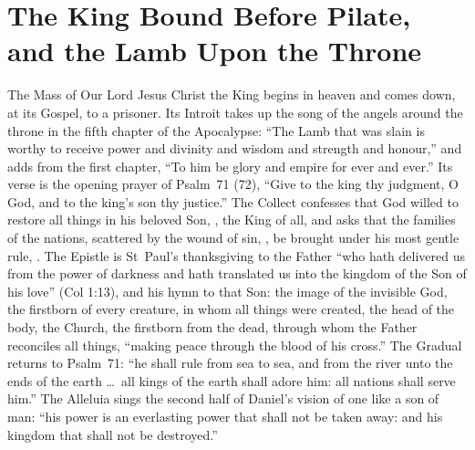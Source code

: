 \section{The King Bound Before Pilate, and the Lamb Upon the Throne}
\label{sec:opening}

The Mass of Our Lord Jesus Christ the King begins in heaven and comes down, at
its Gospel, to a prisoner. Its Introit takes up the song of the angels around
the throne in the fifth chapter of the Apocalypse: ``The Lamb that was slain is
worthy to receive power and divinity and wisdom and strength and honour,'' and
adds from the first chapter, ``To him be glory and empire for ever and ever.''
Its verse is the opening prayer of Psalm~71 (72), ``Give to the king thy
judgment, O God, and to the king's son thy justice.'' The Collect confesses
that God willed to restore all things in his beloved Son, , the King of all, and asks that the families of the nations, scattered
by the wound of sin, , be brought under his
most gentle rule, . The Epistle is
St~Paul's thanksgiving to the Father ``who hath delivered us from the power of
darkness and hath translated us into the kingdom of the Son of his love''
(Col 1:13), and his hymn to that Son: the image of the invisible God, the
firstborn of every creature, in whom all things were created, the head of the
body, the Church, the firstborn from the dead, through whom the Father
reconciles all things, ``making peace through the blood of his cross.'' The
Gradual returns to Psalm~71: ``he shall rule from sea to sea, and from the
river unto the ends of the earth \dots\ all kings of the earth shall adore him:
all nations shall serve him.'' The Alleluia sings the second half of Daniel's
vision of one like a son of man: ``his power is an everlasting power that shall
not be taken away: and his kingdom that shall not be destroyed.''

